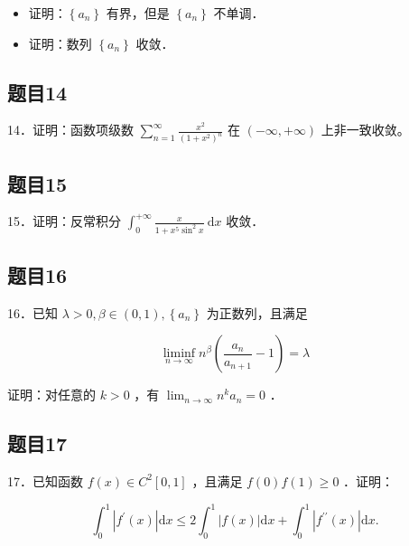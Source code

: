 \documentclass{article}
\begin{document}
\begin{itemize}
  \item[（1）] 证明：\(\left\{a_{n}\right\}\) 有界，但是 \(\left\{a_{n}\right\}\) 不单调．
  \item[（2）] 证明：数列 \(\left\{a_{n}\right\}\) 收敛．
\end{itemize}

\subsection{题目14}
14．证明：函数项级数 \(\sum_{n=1}^{\infty} \frac{x^{2}}{\left(1+x^{2}\right)^{n}}\) 在 \((-\infty,+\infty)\) 上非一致收敛。

\subsection{题目15}
15．证明：反常积分 \(\int_{0}^{+\infty} \frac{x}{1+x^{5} \sin ^{2} x} \mathrm{~d} x\) 收敛．

\subsection{题目16}
16．已知 \(\lambda>0, \beta \in(0,1),\left\{a_{n}\right\}\) 为正数列，且满足

\[
\liminf _{n \rightarrow \infty} n^{\beta}\left(\frac{a_{n}}{a_{n+1}}-1\right)=\lambda
\]

证明：对任意的 \(k>0\) ，有 \(\lim _{n \rightarrow \infty} n^{k} a_{n}=0\) ．

\subsection{题目17}
17．已知函数 \(f(x) \in C^{2}[0,1]\) ，且满足 \(f(0) f(1) \geq 0\) ．证明：

\[
\int_{0}^{1}\left|f^{\prime}(x)\right| \mathrm{d} x \leq 2 \int_{0}^{1}|f(x)| \mathrm{d} x+\int_{0}^{1}\left|f^{\prime \prime}(x)\right| \mathrm{d} x .
\]
\end{document}
